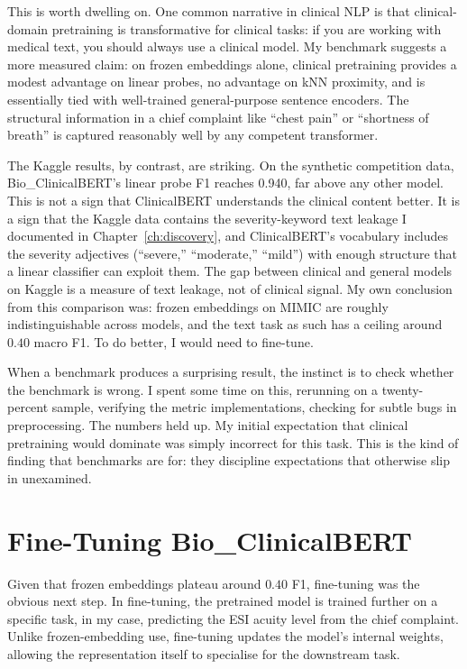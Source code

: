 This is worth dwelling on. One common narrative in clinical NLP is that clinical-domain pretraining is transformative for clinical tasks: if you are working with medical text, you should always use a clinical model. My benchmark suggests a more measured claim: on frozen embeddings alone, clinical pretraining provides a modest advantage on linear probes, no advantage on kNN proximity, and is essentially tied with well-trained general-purpose sentence encoders. The structural information in a chief complaint like ``chest pain'' or ``shortness of breath'' is captured reasonably well by any competent transformer.

The Kaggle results, by contrast, are striking. On the synthetic competition data, Bio\_ClinicalBERT's linear probe F1 reaches 0.940, far above any other model. This is not a sign that ClinicalBERT understands the clinical content better. It is a sign that the Kaggle data contains the severity-keyword text leakage I documented in Chapter~\ref{ch:discovery}, and ClinicalBERT's vocabulary includes the severity adjectives (``severe,'' ``moderate,'' ``mild'') with enough structure that a linear classifier can exploit them. The gap between clinical and general models on Kaggle is a measure of text leakage, not of clinical signal. My own conclusion from this comparison was: frozen embeddings on MIMIC are roughly indistinguishable across models, and the text task as such has a ceiling around $0.40$ macro F1. To do better, I would need to fine-tune.

\begin{remarkbox}
When a benchmark produces a surprising result, the instinct is to check whether the benchmark is wrong. I spent some time on this, rerunning on a twenty-percent sample, verifying the metric implementations, checking for subtle bugs in preprocessing. The numbers held up. My initial expectation that clinical pretraining would dominate was simply incorrect for this task. This is the kind of finding that benchmarks are for: they discipline expectations that otherwise slip in unexamined.
\end{remarkbox}

\section{Fine-Tuning Bio\_ClinicalBERT}

Given that frozen embeddings plateau around $0.40$ F1, fine-tuning was the obvious next step. In fine-tuning, the pretrained model is trained further on a specific task, in my case, predicting the ESI acuity level from the chief complaint. Unlike frozen-embedding use, fine-tuning updates the model's internal weights, allowing the representation itself to specialise for the downstream task.

